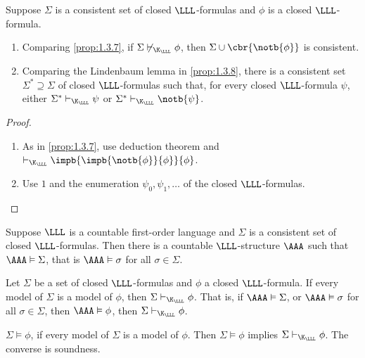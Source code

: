 \begin{proposition}
\label{prop:2.5.2}
Suppose $ \Sigma $ is a consistent set of closed $ \LLL $-formulas and $ \phi $ is a closed $ \LLL $-formula.
\begin{enumerate}
\item Comparing \ref{prop:1.3.7}, if $ \Sigma \not\vdash_{\K_\LLL} \phi $, then $ \Sigma \cup \cbr{\notb{\phi}} $ is consistent.
\item Comparing the Lindenbaum lemma in \ref{prop:1.3.8}, there is a consistent set $ \Sigma^* \supseteq \Sigma $ of closed $ \LLL $-formulas such that, for every closed $ \LLL $-formula $ \psi $, either $ \Sigma^* \vdash_{\K_\LLL} \psi $ or $ \Sigma^* \vdash_{\K_\LLL} \notb{\psi} $.
\end{enumerate}
\end{proposition}

\begin{proof}
\hfill
\begin{enumerate}
\item As in \ref{prop:1.3.7}, use deduction theorem and $ \vdash_{\K_\LLL} \impb{\impb{\notb{\phi}}{\phi}}{\phi} $.
\item Use $ 1 $ and the enumeration $ \psi_0, \psi_1, \dots $ of the closed $ \LLL $-formulas.
\end{enumerate}
\end{proof}

\begin{theorem}
\label{thm:2.5.3}
Suppose $ \LLL $ is a countable first-order language and $ \Sigma $ is a consistent set of closed $ \LLL $-formulas. Then there is a countable $ \LLL $-structure $ \AAA $ such that $ \AAA \vDash \Sigma $, that is $ \AAA \vDash \sigma $ for all $ \sigma \in \Sigma $.
\end{theorem}

\begin{theorem}
\label{thm:2.5.4}
Let $ \Sigma $ be a set of closed $ \LLL $-formulas and $ \phi $ a closed $ \LLL $-formula. If every model of $ \Sigma $ is a model of $ \phi $, then $ \Sigma \vdash_{\K_\LLL} \phi $. That is, if $ \AAA \vDash \Sigma $, or $ \AAA \vDash \sigma $ for all $ \sigma \in \Sigma $, then $ \AAA \vDash \phi $, then $ \Sigma \vdash_{\K_\LLL} \phi $.
\end{theorem}

\begin{notation*}
$ \Sigma \vDash \phi $, if every model of $ \Sigma $ is a model of $ \phi $. Then $ \Sigma \vDash \phi $ implies $ \Sigma \vdash_{\K_\LLL} \phi $. The converse is soundness.
\end{notation*}

